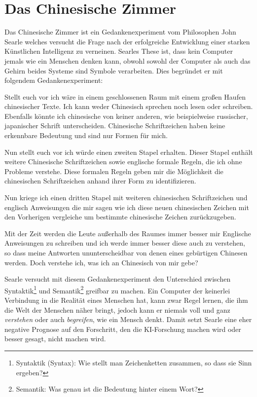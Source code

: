 \documentclass[12pt,german,ngerman]{report}
\begin{document}
    \section{Das Chinesische Zimmer}
    Das Chinesische Zimmer ist ein Gedankenexperiment vom Philosophen John Searle welches
    versucht die Frage nach der erfolgreiche Entwicklung einer starken Künstlichen Intelligenz zu verneinen.
    Searles These ist, dass kein Computer jemals wie ein Menschen denken kann,
    obwohl sowohl der Computer als auch das Gehirn beides Systeme sind Symbole verarbeiten.\cite{nimtz2013chinesische}
    Dies begründet er mit folgendem Gedankenexperiment:
    \begin{displayquote}
        Stellt euch vor ich wäre in einem geschlossenen Raum mit einem großen Haufen chinesischer Texte.
        Ich kann weder Chinesisch sprechen noch lesen oder schreiben.
        Ebenfalls könnte ich chinesische von keiner anderen, wie beispielweise russischer, japanischer Schrift unterscheiden.
        Chinesische Schriftzeichen haben keine erkennbare Bedeutung und sind nur Formen für mich.

        Nun stellt euch vor ich würde einen zweiten Stapel erhalten. Dieser Stapel enthält weitere
        Chinesische Schriftzeichen sowie englische formale Regeln, die ich ohne Probleme verstehe.
        Diese formalen Regeln geben mir die Möglichkeit die chinesischen Schriftzeichen
        anhand ihrer Form zu identifizieren.

        Nun kriege ich einen dritten Stapel mit weiteren chinesischen Schriftzeichen und englisch Anweisungen die mir sagen wie ich
        diese neuen chinesischen Zeichen mit den Vorherigen vergleiche um bestimmte chinesische Zeichen zurückzugeben.

        Mit der Zeit werden die Leute außerhalb des Raumes immer besser mir Englische Anweisungen zu schreiben und
        ich werde immer besser diese auch zu verstehen, so dass meine Antworten ununterscheidbar von denen eines
        gebürtigen Chinesen werden. Doch verstehe ich, was ich an Chinesisch von mir gebe?
        \cite[1]{searle1999chinese}
    \end{displayquote}
    Searle versucht mit diesem Gedankenexperiment den Unterschied zwischen
    Syntaktik\footnote{Syntaktik (Syntax): Wie stellt man Zeichenketten zusammen, so dass sie Sinn ergeben?}
    und Semantik\footnote{Semantik: Was genau ist die Bedeutung hinter einem Wort?}
    greifbar zu machen.
    Ein Computer der keinerlei Verbindung in die Realität eines Menschen hat, kann zwar Regel lernen, die ihm die
    Welt der Menschen näher bringt, jedoch kann er niemals voll und ganz \emph{verstehen} oder auch \emph{begreifen},
    wie ein Mensch denkt. Damit setzt Searle eine eher negative Prognose auf den Forschritt, den die KI-Forschung
    machen wird oder besser gesagt, nicht machen wird.
\end{document}
